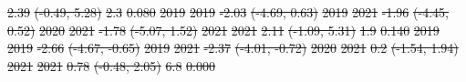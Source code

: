 \documentclass[
  letterpaper,
  DIV=11,
  numbers=noendperiod]{scrartcl}
\providecommand{\DIFdeltex}[1]{{\protect\color{red}\sout{#1}}}                      %
\providecommand{\DIFdelFL}[1]{\DIFdel{#1}} %
\providecommand{\DIFdel}[1]{\texorpdfstring{\DIFdeltex{#1}}{}} %
\begin{document}
\DIFdelFL{2.39 }%
\DIFdelFL{(-0.49, 5.28) }%
\DIFdelFL{2.3 }%
\DIFdelFL{0.080}%
\DIFdelFL{\hspace{1em}2019 }%
\DIFdelFL{2019 }%
\DIFdelFL{-2.03 }%
\DIFdelFL{(-4.69, 0.63) }%
\DIFdelFL{\hspace{1em}2019 }%
\DIFdelFL{2021 }%
\DIFdelFL{-1.96 }%
\DIFdelFL{(-4.45, 0.52) }%
\DIFdelFL{\hspace{1em}2020 }%
\DIFdelFL{2021 }%
\DIFdelFL{-1.78 }%
\DIFdelFL{(-5.07, 1.52) }%
\DIFdelFL{\hspace{1em}2021 }%
\DIFdelFL{2021 }%
\DIFdelFL{2.11 }%
\DIFdelFL{(-1.09, 5.31) }%
\DIFdelFL{1.9 }%
\DIFdelFL{0.140}%
\DIFdelFL{\hspace{1em}2019 }%
\DIFdelFL{2019 }%
\DIFdelFL{-2.66 }%
\DIFdelFL{(-4.67, -0.65) }%
\DIFdelFL{\hspace{1em}2019 }%
\DIFdelFL{2021 }%
\DIFdelFL{-2.37 }%
\DIFdelFL{(-4.01, -0.72) }%
\DIFdelFL{\hspace{1em}2020 }%
\DIFdelFL{2021 }%
\DIFdelFL{0.2 }%
\DIFdelFL{(-1.54, 1.94) }%
\DIFdelFL{\hspace{1em}2021 }%
\DIFdelFL{2021 }%
\DIFdelFL{0.78 }%
\DIFdelFL{(-0.48, 2.05) }%
\DIFdelFL{6.8 }%
\DIFdelFL{0.000}%
\end{document}
